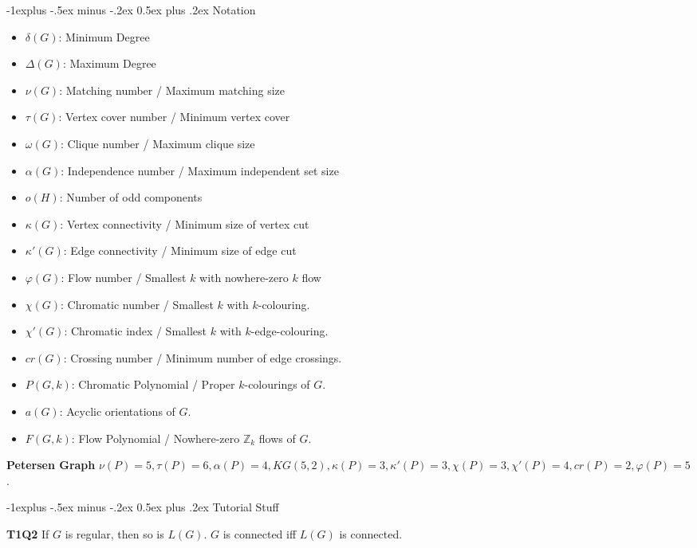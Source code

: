 \documentclass[10pt, landscape]{article}
\makeatletter
\renewcommand{\section}{\@startsection{section}{1}{0mm}%
                                {-1ex plus -.5ex minus -.2ex}%
                                {0.5ex plus .2ex}%
                                {\normalfont\large\bfseries}}
\renewcommand{\section}{\@startsection{section}{2}{0mm}%
                                {-1explus -.5ex minus -.2ex}%
                                {0.5ex plus .2ex}%
                                {\normalfont\normalsize\bfseries}}
\makeatother
\begin{document}
\begin{multicols*}{3}
\section{Notation}
\begin{itemize}
    \item \textbf{$\delta(G)$}: Minimum Degree
    \item \textbf{$\Delta(G)$}: Maximum Degree
    \item \textbf{$\nu(G)$}: Matching number / Maximum matching size
    \item \textbf{$\tau(G)$}: Vertex cover number / Minimum vertex cover
    \item \textbf{$\omega(G)$}: Clique number / Maximum clique size
    \item \textbf{$\alpha(G)$}: Independence number / Maximum independent set size
    \item \textbf{$o(H)$}: Number of odd components
    \item \textbf{$\kappa(G)$}: Vertex connectivity / Minimum size of vertex cut
    \item \textbf{$\kappa'(G)$}: Edge connectivity / Minimum size of edge cut
    \item \textbf{$\varphi(G)$}: Flow number / Smallest $k$ with nowhere-zero $k$ flow
    \item \textbf{$\chi(G)$}: Chromatic number / Smallest $k$ with $k$-colouring.
    \item \textbf{$\chi'(G)$}: Chromatic index / Smallest $k$ with $k$-edge-colouring.
    \item \textbf{$cr(G)$}: Crossing number / Minimum number of edge crossings.
    \item \textbf{$P(G, k)$}: Chromatic Polynomial / Proper $k$-colourings of $G$.
    \item \textbf{$a(G)$}: Acyclic orientations of $G$.
    \item \textbf{$F(G, k)$}: Flow Polynomial / Nowhere-zero $\mathbb{Z}_k$ flows of $G$.
\end{itemize}

\textbf{Petersen Graph} $\nu(P)=5, \tau(P)=6, \alpha(P)=4, KG(5, 2), \kappa(P) = 3, \kappa'(P)=3,\chi(P)=3, \chi'(P)=4, cr(P)=2, \varphi(P)=5$.

\section{Tutorial Stuff}

\textbf{T1Q2} If $G$ is regular, then so is $L(G)$. $G$ is connected iff $L(G)$ is connected.


\end{multicols*}
\end{document}
